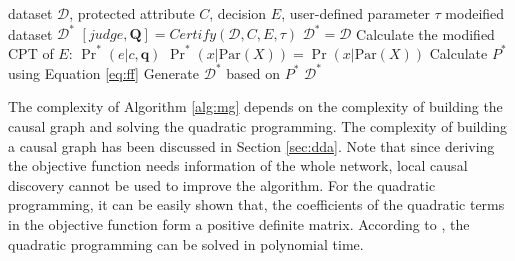 \documentclass[twoside,leqno,twocolumn]{article}
\begin{document}
\begin{algorithm}[htb]\small
\caption{Removal by Modifying Graph (MGraph)}
\label{alg:mg}
\begin{algorithmic}[1]
\REQUIRE dataset $\mathcal{D}$, protected attribute $C$, decision $E$, user-defined parameter $\tau$
\ENSURE modeified dataset $\mathcal{D}^{*}$
		\STATE $[judge,\mathbf{Q}]=Certify(\mathcal{D},C,E,\tau)$
			\STATE $\mathcal{D}^{*}=\mathcal{D}$
		\ELSE
			\STATE Calculate the modified CPT of $E$: $\Pr^{*}(e|c,\mathbf{q})$
				\STATE $\Pr^{*}(x|\mathrm{Par}(X)) = \Pr(x|\mathrm{Par}(X))$
			\ENDFOR
			\STATE Calculate $P^{*}$ using Equation \eqref{eq:ff}
			\STATE Generate $\mathcal{D}^{*}$ based on $P^{*}$
		\ENDIF
		\RETURN $\mathcal{D}^{*}$
\end{algorithmic}
\end{algorithm}


The complexity of Algorithm \ref{alg:mg} depends on the complexity of building the causal graph and solving the quadratic programming. The complexity of building a causal graph has been discussed in Section \ref{sec:dda}. Note that since deriving the objective function needs information of the whole network, local causal discovery cannot be used to improve the algorithm. For the quadratic programming, it can be easily shown that, the coefficients of the quadratic terms in the objective function form a positive definite matrix. According to \cite{kozlov1980polynomial}, the quadratic programming can be solved in polynomial time. 
\end{document}
